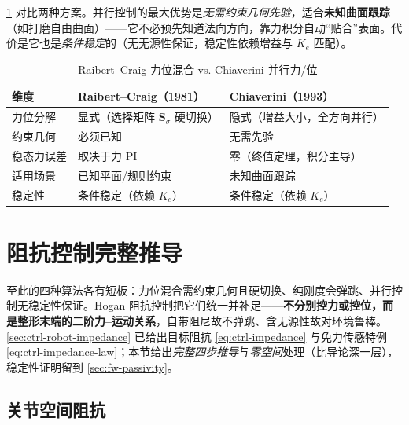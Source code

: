 \cref{tab:fw-rc-vs-parallel} 对比两种方案。并行控制的最大优势是\emph{无需约束几何先验}，适合\textbf{未知曲面跟踪}（如打磨自由曲面）——它不必预先知道法向方向，靠力积分自动“贴合”表面。代价是它也是\emph{条件稳定}的（无无源性保证，稳定性依赖增益与 $K_e$ 匹配）。

\begin{table}[H]\centering\small
\caption{Raibert--Craig 力位混合 vs. Chiaverini 并行力/位}
\label{tab:fw-rc-vs-parallel}
\begin{tabular}{lll}
\toprule
维度 & Raibert--Craig（1981） & Chiaverini（1993） \\
\midrule
力位分解 & 显式（选择矩阵 $\mathbf{S}_\sigma$ 硬切换） & 隐式（增益大小，全方向并行） \\
约束几何 & 必须已知 & 无需先验 \\
稳态力误差 & 取决于力 PI & 零（终值定理，积分主导） \\
适用场景 & 已知平面/规则约束 & 未知曲面跟踪 \\
稳定性 & 条件稳定（依赖 $K_e$） & 条件稳定（依赖 $K_e$） \\
\bottomrule
\end{tabular}
\end{table}

\section{阻抗控制完整推导}
\label{sec:fw-impedance}

至此的四种算法各有短板：力位混合需约束几何且硬切换、纯刚度会弹跳、并行控制无稳定性保证。Hogan 阻抗控制把它们统一并补足——\textbf{不分别控力或控位，而是整形末端的二阶力--运动关系}，自带阻尼故不弹跳、含无源性故对环境鲁棒。\cref{sec:ctrl-robot-impedance} 已给出目标阻抗 \cref{eq:ctrl-impedance} 与免力传感特例 \cref{eq:ctrl-impedance-law}；本节给出\emph{完整四步推导}与\emph{零空间}处理（比导论深一层），稳定性证明留到 \cref{sec:fw-passivity}。

\subsection{关节空间阻抗}
\label{sec:fw-impedance-joint}

